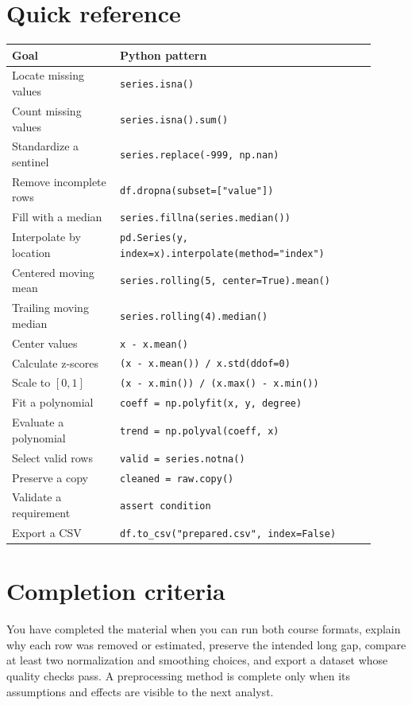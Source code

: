 \documentclass[11pt,letterpaper]{article}
\begin{document}
\section{Quick reference}

\small
\begin{longtable}{@{}p{0.27\linewidth}p{0.64\linewidth}@{}}
\toprule
Goal & Python pattern \\
\midrule
\endhead
Locate missing values & \texttt{series.isna()} \\
Count missing values & \texttt{series.isna().sum()} \\
Standardize a sentinel & \texttt{series.replace(-999, np.nan)} \\
Remove incomplete rows & \texttt{df.dropna(subset=["value"])} \\
Fill with a median & \texttt{series.fillna(series.median())} \\
Interpolate by location & \texttt{pd.Series(y, index=x).interpolate(method="index")} \\
Centered moving mean & \texttt{series.rolling(5, center=True).mean()} \\
Trailing moving median & \texttt{series.rolling(4).median()} \\
Center values & \texttt{x - x.mean()} \\
Calculate z-scores & \texttt{(x - x.mean()) / x.std(ddof=0)} \\
Scale to $[0,1]$ & \texttt{(x - x.min()) / (x.max() - x.min())} \\
Fit a polynomial & \texttt{coeff = np.polyfit(x, y, degree)} \\
Evaluate a polynomial & \texttt{trend = np.polyval(coeff, x)} \\
Select valid rows & \texttt{valid = series.notna()} \\
Preserve a copy & \texttt{cleaned = raw.copy()} \\
Validate a requirement & \texttt{assert condition} \\
Export a CSV & \texttt{df.to\_csv("prepared.csv", index=False)} \\
\bottomrule
\end{longtable}
\normalsize

\section*{Completion criteria}

You have completed the material when you can run both course formats, explain
why each row was removed or estimated, preserve the intended long gap, compare
at least two normalization and smoothing choices, and export a dataset whose
quality checks pass. A preprocessing method is complete only when its assumptions
and effects are visible to the next analyst.
\end{document}
